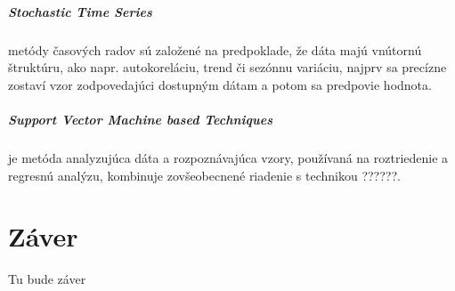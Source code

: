 \documentclass[12pt,oneside,slovak,a4paper]{book}
\begin{document}
\paragraph{Stochastic Time Series}
metódy časových radov sú založené na predpoklade, že dáta majú vnútornú
štruktúru, ako napr. autokoreláciu, trend či sezónnu variáciu, najprv sa
precízne zostaví vzor zodpovedajúci dostupným dátam a potom sa predpovie
hodnota\cite{KumarSingh2013}.

\paragraph{Support Vector Machine based Techniques}
je metóda analyzujúca dáta a rozpoznávajúca vzory, používaná na roztriedenie
a regresnú analýzu, kombinuje zovšeobecnené riadenie
s technikou ??????\cite{KumarSingh2013}.


\chapter{Záver} \label{zaver}
Tu bude záver




\end{document}
